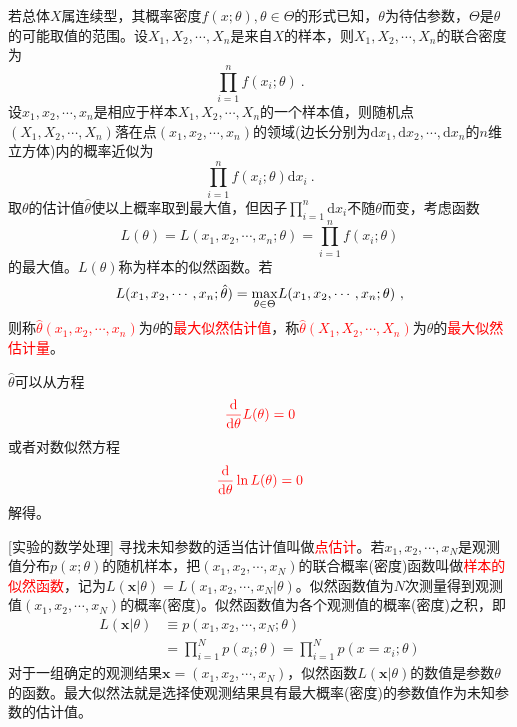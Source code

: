 \documentclass[12pt,a4paper]{article}
\renewcommand{\vec}[1]{\boldsymbol{#1}}
\newcommand{\dif}{\mathrm{d}}
\begin{document}
若总体$X$属连续型，其概率密度$f(x;\theta), \theta\in \Theta$的形式已知，$\theta$为待估参数，$\Theta$是$\theta$的可能取值的范围。设$X_1, X_2, \cdots, X_n$是来自$X$的样本，则$X_1, X_2, \cdots, X_n$的联合密度为
\begin{equation*}
\prod_{i=1}^n f(x_i;\theta) ~.
\end{equation*}
设$x_1, x_2, \cdots, x_n$是相应于样本$X_1, X_2, \cdots, X_n$的一个样本值，则随机点$(X_1, X_2, \cdots, X_n)$落在点$(x_1, x_2, \cdots, x_n)$的领域(边长分别为$\dif x_1, \dif x_2, \cdots, \dif x_n$的$n$维立方体)内的概率近似为
\begin{equation}
\prod_{i=1}^n f(x_i;\theta) \dif x_i ~.
\end{equation}
取$\theta$的估计值$\hat{\theta}$使以上概率取到最大值，但因子$\prod_{i=1}^n \dif x_i$不随$\theta$而变，考虑函数
\begin{equation}
L(\theta) = L(x_1,x_2,\cdots,x_n;\theta) = \prod_{i=1}^n f(x_i;\theta)
\end{equation}
的最大值。$L(\theta)$称为样本的似然函数。若
\begin{equation}
L(x_1, x_2, \cdots, x_n;\hat{\theta}) = \underset{\theta\in \Theta}{\rm max} L(x_1, x_2, \cdots, x_n;\theta) ~,
\end{equation}
则称\textcolor{red}{$\hat{\theta}(x_1, x_2, \cdots, x_n)$}为$\theta$的\textcolor{red}{最大似然估计值}，称\textcolor{red}{$\hat{\theta}(X_1, X_2, \cdots, X_n)$}为$\theta$的\textcolor{red}{最大似然估计量}。

$\hat{\theta}$可以从方程
\begin{equation}
\color{red} \frac{\dif}{\dif \theta} L(\theta) = 0 
\end{equation}
或者对数似然方程
\begin{equation}
\color{red} \frac{\dif}{\dif \theta} \ln L(\theta) = 0 
\end{equation}
解得。


[实验的数学处理] 寻找未知参数的适当估计值叫做\textcolor{red}{点估计}。若$x_1, x_2, \cdots, x_N$是观测值分布$p(x;\theta)$的随机样本，把$(x_1, x_2, \cdots, x_N)$的联合概率(密度)函数叫做\textcolor{red}{样本的似然函数}，记为$L(\vec{x}|\theta)=L(x_1, x_2, \cdots, x_N|\theta)$。似然函数值为$N$次测量得到观测值$(x_1, x_2, \cdots, x_N)$的概率(密度)。似然函数值为各个观测值的概率(密度)之积，即
\begin{align}
\nonumber L(\vec{x}|\theta) &\equiv p(x_1, x_2, \cdots, x_N; \theta) \\
& = \prod_{i=1}^N p(x_i; \theta) = \prod_{i=1}^N p(x = x_i; \theta)
\end{align}
对于一组确定的观测结果$\vec{x} = (x_1, x_2, \cdots, x_N)$，似然函数$L(\vec{x}|\theta)$的数值是参数$\theta$的函数。最大似然法就是选择使观测结果具有最大概率(密度)的参数值作为未知参数的估计值。
\end{document}
